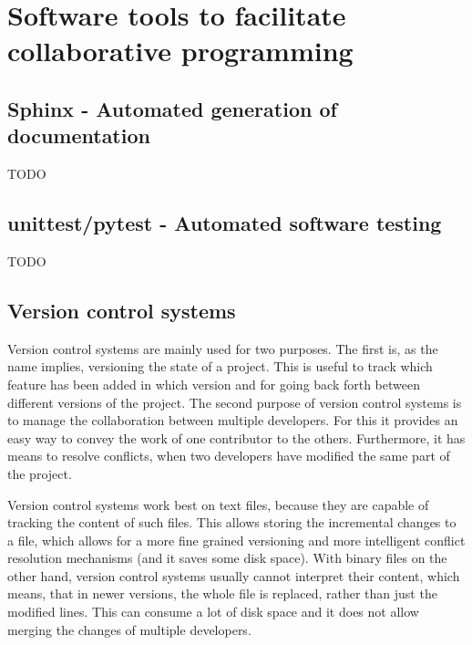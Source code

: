 
\chapter{Software tools to facilitate collaborative programming}

	\section{Sphinx - Automated generation of documentation}
		TODO

	\section{unittest/pytest - Automated software testing}
		TODO

	\section{Version control systems}
		Version control systems are mainly used for two purposes.
		The first is, as the name implies, versioning the state of a project.
		This is useful to track which feature has been added in which version and for going back forth between different versions of the project.
		The second purpose of version control systems is to manage the collaboration between multiple developers.
		For this it provides an easy way to convey the work of one contributor to the others.
		Furthermore, it has means to resolve conflicts, when two developers have modified the same part of the project.

		Version control systems work best on text files, because they are capable of tracking the content of such files.
		This allows storing the incremental changes to a file, which allows for a more fine grained versioning and more intelligent conflict resolution mechanisms (and it saves some disk space).
		With binary files on the other hand, version control systems usually cannot interpret their content, which means, that in newer versions, the whole file is replaced, rather than just the modified lines.
		This can consume a lot of disk space and it does not allow merging the changes of multiple developers.

